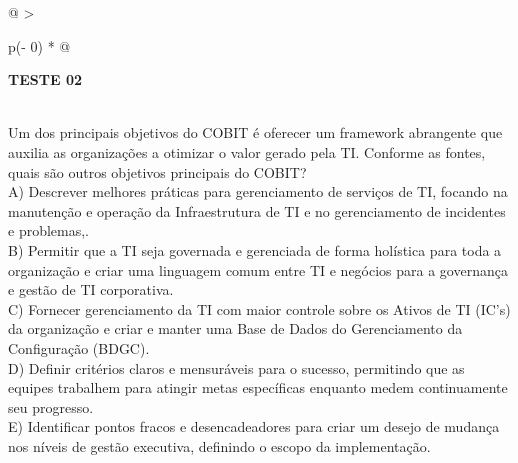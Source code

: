 \documentclass[
]{book}
\begin{document}
\begin{longtable}[]{@{}
  >{\raggedright\arraybackslash}p{(\columnwidth - 0\tabcolsep) * }@{}}
\toprule\noalign{}
\begin{minipage}[b]{\linewidth}\raggedright
\textbf{TESTE 02}
\end{minipage} \\
\midrule\noalign{}
\endhead
\bottomrule\noalign{}
\endlastfoot
Um dos principais objetivos do COBIT é oferecer um framework abrangente que auxilia as organizações a otimizar o valor gerado pela TI. Conforme as fontes, quais são outros objetivos principais do COBIT? \\
A) Descrever melhores práticas para gerenciamento de serviços de TI, focando na manutenção e operação da Infraestrutura de TI e no gerenciamento de incidentes e problemas,. \\
B) Permitir que a TI seja governada e gerenciada de forma holística para toda a organização e criar uma linguagem comum entre TI e negócios para a governança e gestão de TI corporativa. \\
C) Fornecer gerenciamento da TI com maior controle sobre os Ativos de TI (IC's) da organização e criar e manter uma Base de Dados do Gerenciamento da Configuração (BDGC). \\
D) Definir critérios claros e mensuráveis para o sucesso, permitindo que as equipes trabalhem para atingir metas específicas enquanto medem continuamente seu progresso. \\
E) Identificar pontos fracos e desencadeadores para criar um desejo de mudança nos níveis de gestão executiva, definindo o escopo da implementação. \\
\end{longtable}
\end{document}
